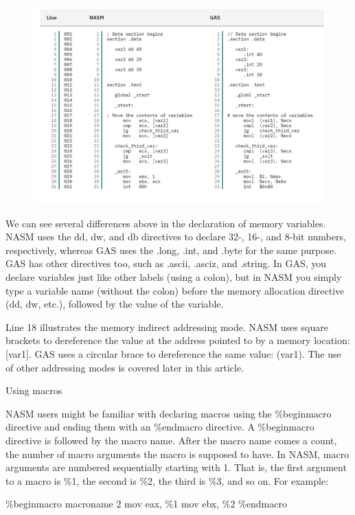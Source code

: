 \begin{flushleft}
\begin{figure}[H]
  \centering
  \includegraphics[width=0.8\linewidth]{figure/exercise_1}\\
\end{figure}

We can see several differences above in the declaration of memory variables. NASM uses the dd, dw, and db directives to declare 32-, 16-, and 8-bit numbers, respectively, whereas GAS uses the .long, .int, and .byte for the same purpose. GAS has other directives too, such as .ascii, .asciz, and .string. In GAS, you declare variables just like other labels (using a colon), but in NASM you simply type a variable name (without the colon) before the memory allocation directive (dd, dw, etc.), followed by the value of the variable.

Line 18 illustrates the memory indirect addressing mode. NASM uses square brackets to dereference the value at the address pointed to by a memory location: [var1]. GAS uses a circular brace to dereference the same value: (var1). The use of other addressing modes is covered later in this article.

\medskip

{\large Using macros}

NASM users might be familiar with declaring macros using the \%beginmacro directive and ending them with an \%endmacro directive. A \%beginmacro directive is followed by the macro name. After the macro name comes a count, the number of macro arguments the macro is supposed to have. In NASM, macro arguments are numbered sequentially starting with 1. That is, the first argument to a macro is \%1, the second is \%2, the third is \%3, and so on. For example:

\quad \%beginmacro macroname 2
   \quad mov eax, \%1
   \quad mov ebx, \%2
\quad \%endmacro


\end{flushleft}
